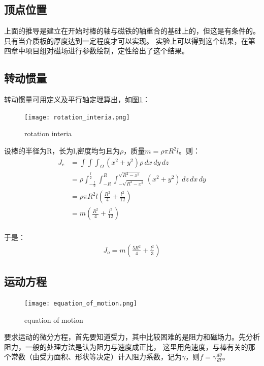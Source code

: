 \documentclass[AutoFakeBold]{LZUThesis}
\begin{document}
\subsection{顶点位置}
上面的推导是建立在开始时棒的轴与磁铁的轴重合的基础上的，但这是有条件的。只有当介质板的厚度达到一定程度才可以实现。
实验上可以得到这个结果，在第四章中项目组对磁场进行参数绘制，定性给出了这个结果。

\subsection{转动惯量}
转动惯量可用定义及平行轴定理算出，如图\ref{rotation_interia}：
\begin{figure}[H]
    \centering
    \texttt{[image: rotation\_interia.png]}
    \caption{rotation interia}
    \label{rotation_interia}
\end{figure}
设棒的半径为R，长为l,密度均匀且为$\rho$，质量$m = \rho\pi R^2l$。则：
\begin{equation}
    \begin{aligned}
    J_c &= \int\int\int_{\Omega} (x^2+y^2)\rho \,dx\,dy\,dz\\
    &= \rho\int_{-\frac{l}{2}}^{\frac{l}{2}}\int_{-R}^{R}\int_{-\sqrt{R^2-x^2}}^{\sqrt{R^2-x^2}} (x^2+y^2) \,dz\,dx\,dy\\
    &= \rho\pi R^2l(\frac{R^2}{4}+\frac{l^2}{12})\\
    &= m(\frac{R^2}{4}+\frac{l^2}{12})\\
    \end{aligned}
\end{equation}

于是：
\begin{equation}
\begin{aligned}
J_o = m(\frac{5R^2}{4}+\frac{l^2}{3})
\end{aligned}
\end{equation}

\subsection{运动方程}
\begin{figure}[H]
    \centering
    \texttt{[image: equation\_of\_motion.png]}
    \caption{equation of motion}
    \label{equation_of_motion}
\end{figure}
要求运动的微分方程，首先要知道受力，其中比较困难的是阻力和磁场力。先分析阻力，一般的处理方法是认为阻力与速度成正比，
这里用角速度，与棒有关的那个常数（由受力面积、形状等决定）计入阻力系数，记为$\gamma$，则$f = \gamma \frac{d\theta}{dt}$。
\end{document}
